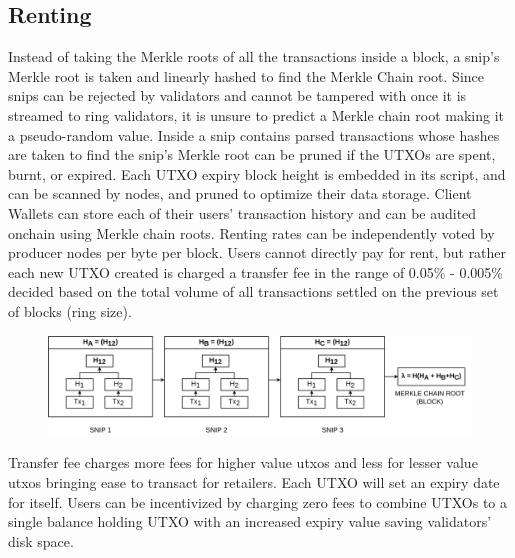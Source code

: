 \documentclass[a4paper,	10pt]{extarticle}
\begin{document}
\subsection{Renting}
Instead of taking the Merkle roots of all the transactions inside a block, a snip's Merkle root is taken and linearly hashed to find the Merkle Chain root. Since snips can be rejected by validators and cannot be tampered with once it is streamed to ring validators, it is unsure to predict a Merkle chain root making it a pseudo-random value. Inside a snip contains parsed transactions whose hashes are taken to find the snip's Merkle root can be pruned if the UTXOs are spent, burnt, or expired. Each UTXO expiry block height is embedded in its script, and can be scanned by nodes, and pruned to optimize their data storage. Client Wallets can store each of their users' transaction history and can be audited onchain using Merkle chain roots. Renting rates can be independently voted by producer nodes per byte per block. Users cannot directly pay for rent, but rather each new UTXO created is charged a transfer fee in the range of 0.05\% - 0.005\% decided based on the total volume of all transactions settled on the previous set of blocks (ring size).\\
\begin{figure}[H]
\begin{center}
\includegraphics[width=13cm]{merklechain}
\end{center}
\end{figure}
 Transfer fee charges more fees for higher value utxos and less for lesser value utxos bringing ease to transact for retailers. Each UTXO will set an expiry date for itself. Users can be incentivized by charging zero fees to combine UTXOs to a single balance holding UTXO with an increased expiry value saving validators' disk space. 
\end{document}
